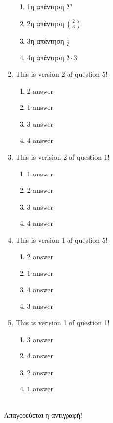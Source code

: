 \documentclass[a4paper, 11pt]{article}
\begin{document}
\begin{enumerate}
\begin{enumerate}[(1)]
    \item 1η απάντηση $2^n$
    \item 2η απάντηση $\binom{2}{3}$
    \item 3η απάντηση $\frac{1}{2}$
    \item 4η απάντηση $2\cdot 3$
\end{enumerate}
\item This is version 2 of question 5!
\begin{enumerate}[(1)]
    \item 2 answer
    \item 1 answer
    \item 3 answer
    \item 4 answer
\end{enumerate}
\item This is verision 2 of question 1!
\begin{enumerate}[(1)]
    \item 1 answer
    \item 2 answer
    \item 3 answer
    \item 4 answer
\end{enumerate}
\item This is version 1 of question 5!
\begin{enumerate}[(1)]
    \item 2 answer
    \item 1 answer
    \item 4 answer
    \item 3 answer
\end{enumerate}
\item This is verision 1 of question 1!
\begin{enumerate}[(1)]
    \item 3 answer
    \item 4 answer
    \item 2 answer
    \item 1 answer
\end{enumerate}
\end{enumerate}
\hrulefill \\ 

Απαγορεύεται η αντιγραφή! 

\newpage 
\end{document}
